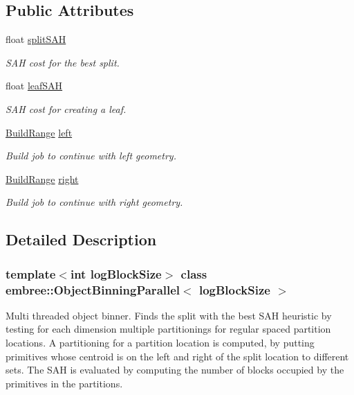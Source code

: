 \subsection*{Public Attributes}
\begin{DoxyCompactItemize}
\item 
float \hyperlink{classembree_1_1_object_binning_parallel_a41d417b66e217e9f1703404fdc57f8db}{splitSAH}
\begin{DoxyCompactList}\small\item\em SAH cost for the best split. \item\end{DoxyCompactList}\item 
float \hyperlink{classembree_1_1_object_binning_parallel_a6b960f1ed6ddbf38da900a6bd378629c}{leafSAH}
\begin{DoxyCompactList}\small\item\em SAH cost for creating a leaf. \item\end{DoxyCompactList}\item 
\hyperlink{structembree_1_1_build_range}{BuildRange} \hyperlink{classembree_1_1_object_binning_parallel_a4475a71969aef36af6173760da4e43ec}{left}
\begin{DoxyCompactList}\small\item\em Build job to continue with left geometry. \item\end{DoxyCompactList}\item 
\hyperlink{structembree_1_1_build_range}{BuildRange} \hyperlink{classembree_1_1_object_binning_parallel_a9bc006f56e93a16bc1d070e8db742533}{right}
\begin{DoxyCompactList}\small\item\em Build job to continue with right geometry. \item\end{DoxyCompactList}\end{DoxyCompactItemize}


\subsection{Detailed Description}
\subsubsection*{template$<$int logBlockSize$>$ class embree::ObjectBinningParallel$<$ logBlockSize $>$}

Multi threaded object binner. Finds the split with the best SAH heuristic by testing for each dimension multiple partitionings for regular spaced partition locations. A partitioning for a partition location is computed, by putting primitives whose centroid is on the left and right of the split location to different sets. The SAH is evaluated by computing the number of blocks occupied by the primitives in the partitions. 

